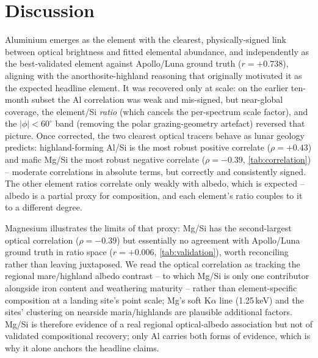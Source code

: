 \documentclass[journal,lettersize]{IEEEtran}
\begin{document}
\section{Discussion}\label{sec:discussion}

Aluminium emerges as the element with the clearest, physically-signed
link between optical brightness and fitted elemental abundance, and
independently as the best-validated element against Apollo/Luna ground
truth ($r=+0.738$), aligning with the anorthosite-highland reasoning
that originally motivated it as the expected headline element. It was
recovered only at scale: on the earlier ten-month subset the Al
correlation was weak and mis-signed, but near-global coverage, the
element/Si \emph{ratio} (which cancels the per-spectrum scale factor),
and the $|\phi|<60^{\circ}$ band (removing the polar grazing-geometry
artefact) reversed that picture. Once corrected, the two clearest
optical tracers behave as lunar geology predicts: highland-forming Al/Si
is the most robust positive correlate ($\rho=+0.43$) and mafic Mg/Si the
most robust negative correlate ($\rho=-0.39$, \cref{tab:correlation}) --
moderate correlations in absolute terms, but correctly and consistently
signed. The other element ratios correlate only weakly with albedo,
which is expected -- albedo is a partial proxy for composition, and each
element's ratio
couples to it to a different degree.

Magnesium illustrates the limits of that proxy: Mg/Si has the
second-largest optical correlation ($\rho=-0.39$) but essentially no
agreement with Apollo/Luna ground truth in ratio space
($r=+0.006$, \cref{tab:validation}), worth reconciling rather than
leaving juxtaposed. We read the optical correlation as tracking the
regional mare/highland albedo contrast -- to which Mg/Si is only one
contributor alongside iron content and weathering maturity -- rather
than element-specific composition at a landing site's point scale; Mg's
soft K$\alpha$ line (1.25\,keV) and the sites' clustering on nearside
maria/highlands are plausible additional factors. Mg/Si is therefore
evidence of a real regional optical-albedo association but not of
validated compositional recovery; only Al carries both forms of
evidence, which is why it alone anchors the headline claims.
\end{document}
